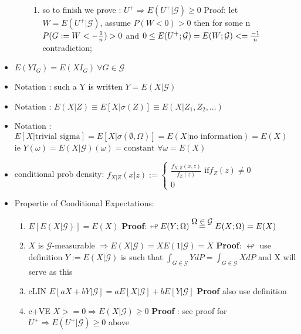 \documentclass[10pt,landscape,a4paper]{article}
\newcommand\myeq[1]{\stackrel{{\normalfont\mbox{#1}}}{ = }}
\begin{document}
\begin{multicols*}{3}
\begin{spacing}{0.5}
\begin{itemize}
\begin{enumerate}
\begin{enumerate}
\item so to finish we prove :  \colorbox{pink!30} { $U^+ \Rightarrow E(U^+|\mathcal{G}) \ge 0$} Proof: let $W=E(U^+|\mathcal{G})$, assume $P(W<0)>0$ then for some n $P(G:= W<-{1 \over n}) >0$ and $0 \le E(U^+;\mathcal{G}) = E(W;\mathcal{G}) < ={ {-1} \over n}$ contradiction;

\end{enumerate}
\end{enumerate}
\item $E(YI_G) = E(XI_G)\ \forall G \in \mathcal{G}$ 
\item Notation : such a Y is written $Y=E(X|\mathcal{G})$
\item Notation : $E(X|Z) \equiv E[X|\sigma(Z)] \equiv E(X|Z_1,Z_2,...)$
\item Notation : $E[X|\text{trivial sigma}]=E[X|\sigma(\emptyset,\Omega)] = E(X|\text{no information}) = E(X)$ ie $Y(\omega)=E(X|\mathcal{G})(\omega)=\text{constant } \forall \omega=E(X)$

\item conditional prob density: $f_{X|Z}(x|z) := \begin{cases} \frac{f_{X,Z}(x,z)}{f_Z(z)} \text{ if} f_Z(z) \neq 0 \\ 0\end{cases}$ 

\item Propertie of Conditional Expectations:
\begin{enumerate}

\item \colorbox{green!10}{ $E[E(X|\mathcal{G})]=E(X)$} \textbf{Proof}: $\looparrowleft E(Y;\Omega) \myeq{$\Omega \in \mathcal{G}$}  E(X;\Omega) = E(X)$

\item \colorbox{green!10}{ $X$ is  $\mathcal{G}$-measurable $\Rightarrow E(X|\mathcal{G})=XE(1|\mathcal{G})=X$ } \textbf{Proof}: $\looparrowleft$ use definition $Y := E(X|\mathcal{G})$ is such that $\int_{G \in \mathcal{G}} YdP = \int_{G \in \mathcal{G}} X dP$ and X will serve as this

\item \colorbox{green!10}{cLIN $E[aX+bY|\mathcal{G}] = a E[X|\mathcal{G}] + b E[Y|\mathcal{G}] $} \textbf{Proof} also use definition

\item \colorbox{green!10}{c+VE $X >= 0 \Rightarrow E(X|\mathcal{G}) \ge 0$} \textbf{Proof} : see proof for  \colorbox{pink!30} { $U^+ \Rightarrow E(U^+|\mathcal{G}) \ge 0$} above


\end{enumerate}
\end{itemize}
\end{spacing}
\end{multicols*}
\end{document}
